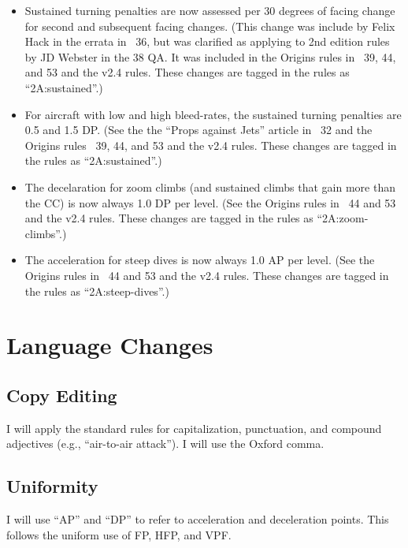 \documentclass[10pt]{article}
\begin{document}
\begin{itemize}
    \item Sustained turning penalties are now assessed per 30 degrees of facing change for second and subsequent facing changes. (This change was include by Felix Hack in the errata in {\APJ}~36, but was clarified as applying to 2nd edition rules by JD Webster in the {\APJ} 38 QA. It was included in the Origins rules in {\APJ}~39, 44, and 53 and the v2.4 rules. These changes are tagged in the rules as “2A:sustained”.)

    \item For aircraft with low and high bleed-rates, the sustained turning penalties are 0.5 and 1.5 DP. (See the the “Props against Jets” article in {\APJ}~32 and the Origins rules {\APJ}~39, 44, and 53 and the v2.4 rules. These changes are tagged in the rules as “2A:sustained”.) 

    \item The decelaration for zoom climbs (and sustained climbs that gain more than the CC) is now always 1.0 DP per level. (See the Origins rules {in \APJ}~44 and 53 and the v2.4 rules. These changes are tagged in the rules as “2A:zoom-climbs”.) 

    \item The acceleration for steep dives is now always 1.0 AP per level. (See the Origins rules in {\APJ}~44 and 53 and the v2.4 rules. These changes are tagged in the rules as “2A:steep-dives”.)

\end{itemize}

\section{Language Changes}

\subsection{Copy Editing}

I will apply the standard rules for capitalization, punctuation, and compound adjectives (e.g., “air-to-air attack”). I will use the Oxford comma.

\subsection{Uniformity}

I will use “AP” and “DP” to refer to acceleration and deceleration points. This follows the uniform use of FP, HFP, and VPF.
\end{document}
